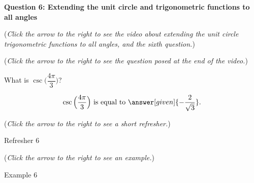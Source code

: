 \documentclass{ximera}
\begin{document}
\textbf{Question 6: Extending the unit circle and trigonometric
functions to all angles}
\begin{question}
\begin{flushright}
{\color{blue}(\emph{Click the arrow to the right to see the
video about extending the unit circle trigonometric functions to all
angles, and the sixth question.})}
\end{flushright}
\begin{center}
\begin{expandable}
{\color{blue}(\emph{Click the arrow to the right to see the question
posed at the end of the video.})}
\begin{expandable}
What is $\csc\Big(\dfrac{4\pi}{3}\Big)$?
\begin{prompt}
\[
\csc\Big( \dfrac{4\pi}{3}\Big) \text{ is equal to } \answer[given]{-\frac{2}{\sqrt{3}}}.
\]
\end{prompt}
\begin{flushright}
{\color{blue}(\emph{Click the arrow to the right to see a short refresher.})}
\end{flushright}
\begin{expandable}
Refresher 6
\end{expandable}
\begin{flushright}
{\color{blue}(\emph{Click the arrow to the right to see an example.})}
\end{flushright}
\begin{expandable}
Example 6
\end{expandable}
\end{expandable}
\end{expandable}
\end{center}
\end{question}
\end{document}
